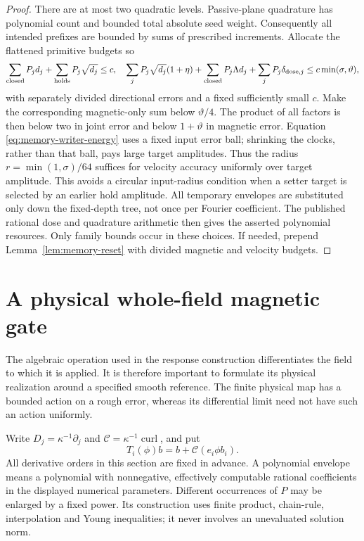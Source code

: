 \documentclass[11pt,a4paper]{amsart}
\theoremstyle{definition}
\theoremstyle{remark}
\numberwithin{equation}{section}
\newcommand{\curl}{\operatorname{curl}}
\begin{document}
\begin{proof}
There are at most two quadratic levels.  Passive-plane quadrature has
polynomial count and bounded total absolute seed weight.  Consequently
all intended prefixes are bounded by sums of prescribed increments.
Allocate the flattened primitive budgets so
\[
 \sum_{\rm closed}P_jd_j+\sum_{\rm holds}P_j\sqrt{d_j}\le c,
 \quad
 \sum_jP_j\sqrt{d_j}(1+\eta)
       +\sum_{\rm closed}P_j\Lambda d_j
       +\sum_jP_j\delta_{{\rm dose},j}
       \le c\min(\sigma,\vartheta),
\]
with separately divided directional errors and a fixed sufficiently small
$c$.  Make the corresponding magnetic-only sum below $\vartheta/4$.
The product of all factors is then below two in joint error and below
$1+\vartheta$ in magnetic error.  Equation
\eqref{eq:memory-writer-energy} uses a fixed input error ball; shrinking
the clocks, rather than that ball, pays large target amplitudes.  Thus
the radius $r=\min(1,\sigma)/64$ suffices for velocity accuracy uniformly
over target amplitude.  This avoids a circular input-radius condition
when a setter target is selected by an earlier hold amplitude.
All temporary envelopes are substituted only down the fixed-depth tree,
not once per Fourier coefficient.  The published rational dose and
quadrature arithmetic then gives the asserted polynomial resources.
Only family bounds occur in these choices.  If needed, prepend
Lemma~\ref{lem:memory-reset} with divided magnetic and velocity budgets.
\end{proof}

\section{A physical whole-field magnetic gate}\label{sec:gate}

The algebraic operation used in the response construction differentiates the
field to which it is applied.  It is therefore important to formulate its
physical realization around a specified smooth reference.  The finite physical
map has a bounded action on a rough error, whereas its differential limit need
not have such an action uniformly.

Write $D_j=\kappa^{-1}\partial_j$ and
$\mathscr C=\kappa^{-1}\curl$, and put
\begin{equation}\label{eq:gate-definition}
 T_i(\phi)b=b+\mathscr C(e_i\phi b_i).
\end{equation}
All derivative orders in this section are fixed in advance.  A polynomial
envelope means a polynomial with nonnegative, effectively computable rational
coefficients in the displayed numerical parameters.  Different occurrences
of $P$ may be enlarged by a fixed power.  Its construction uses finite product,
chain-rule, interpolation and Young inequalities; it never involves an
unevaluated solution norm.
\end{document}
